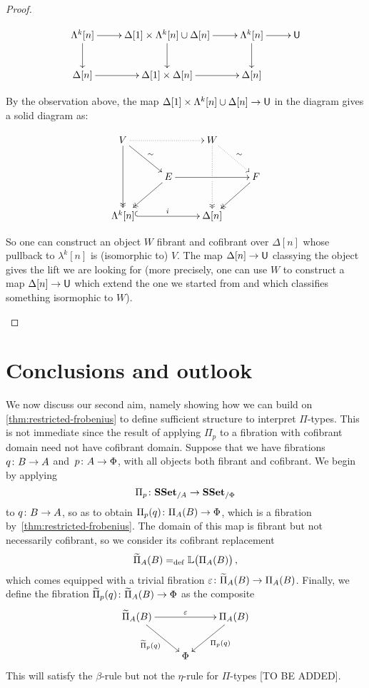 \documentclass[reqno,10pt,a4paper,oneside,draft]{amsart}
\begin{document}
\begin{proof}
\begin{enumerate}[(i)]
\[\xymatrix{\Lambda^k[n] \ar[d] \ar[r] & \Delta[1] \times \Lambda^k[n] \cup \Delta[n] \ar[d] \ar[r] & \Lambda^k[n] \ar[d] \ar[r] & \U \\
\Delta[n] \ar[r] & \Delta[1] \times \Delta[n] \ar[r] & \Delta[n] 
}\]



By the observation above, the map $\Delta[1] \times \Lambda^k[n] \cup \Delta[n] \rightarrow \mathsf{U}$ in the diagram gives a solid diagram as:

\[ 
\xymatrix{
  V
  \ar@{.>}[rr]
  \ar[dr]^{\sim}
  \ar@{->>}[dd]
&&
  W
  \ar@{.>}[dr]^{\sim}
  \ar@{.>>}[dd]|{\hole}
&\\&
  E
  \ar[rr]
  \ar@{->>}[dl]
&&
  F
  \ar@{->>}[dl]
\\
  \Lambda^k[n]
  \ar@{^{(}->}[rr]^i
&&
  \Delta[n]
&
}
\] 


So one can construct an object $W$ fibrant and cofibrant over $\Delta[n]$ whose pullback to $\lambda^k[n]$ is (isomorphic to) $V$. The map $\Delta[n] \rightarrow \mathsf{U}$ classying the object gives the lift we are looking for (more precisely, one can use $W$ to construct  a map $\Delta[n] \rightarrow \mathsf{U}$ which extend the one we started from and which classifies something isormophic to $W$). \qedhere
\end{enumerate}
\end{proof}



\newpage

\section{Conclusions and outlook}
\label{sec:conout}

We now discuss our second aim, namely showing how we can build on \cref{thm:restricted-frobenius} 
to define sufficient structure to interpret $\Pi$-types. This is not immediate since the result of applying $\Pi_p$ to a 
fibration with cofibrant domain need not have cofibrant domain.
 Suppose that we have fibrations 
$q \colon B \to A$ and~$p \colon A \to \Phi$, with
all objects both fibrant and cofibrant. 
We begin by applying 
\[
\Pi_p  \colon \mathbf{SSet}_{/A} \to \mathbf{SSet}_{/\Phi}
\]
to $q \colon B \to A$, so as to obtain $\Pi_p(q) \colon \Pi_A(B) \to \Phi$, which is
a fibration by~\cref{thm:restricted-frobenius}. The domain of this map is fibrant but
not necessarily cofibrant, so we consider its cofibrant replacement 
\[
\widetilde{\Pi}_A(B) =_{\operatorname{def}} \mathbb{L} \big( \Pi_A(B)  \big) \, ,
\]
which comes equipped with a trivial fibration $\varepsilon \colon \widetilde{\Pi}_A(B) \to \Pi_A(B)$.
Finally, we define the fibration $\widetilde{\Pi}_p(q) \colon \widetilde{\Pi}_A(B) \to \Phi$ as 
 the composite
 \[
\xymatrix{
\widetilde{\Pi}_A(B) \ar[rr]^{\varepsilon} \ar[dr]_{\widetilde{\Pi}_p(q) } & & \Pi_A(B) \ar[dl]^{\Pi_p(q)}  \\
 & \Phi &} 
 \]
This will satisfy the $\beta$-rule but not the $\eta$-rule for $\Pi$-types [TO BE ADDED].
\end{document}
